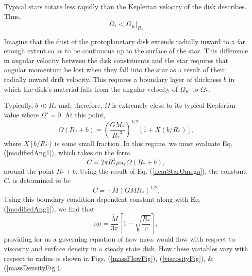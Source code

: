 \documentclass[aps,pra,twocolumn]{revtex4-1}
\begin{document}
Typical stars rotate less rapidly than the Keplerian velocity of the disk describes.  Thus,
\begin{equation}
\Omega_* < \Omega_K\bigg|_{R_*}
\end{equation}

Imagine that the dust of the protoplanetary disk extends radially inward to a far enough extent so as to be continuous up to the surface of the star.  This difference in angular velocity between the disk constituents and the star requires that angular momentum be lost when they fall into the star as a result of their radially inward drift velocity.  This requires a boundary layer of thickness $b$ in which the disk's material falls from the angular velocity of $\Omega_K$ to $\Omega_*$.  

Typically, $b \ll R_*$ and, therefore, $\Omega$ is extremely close to its typical Keplerian value where $\Omega' = 0$.  At this point,
\begin{equation}
\Omega(R_* + b) = \left(\frac{GM_*}{{R_*}^3} \right)^{1/2} \left[1 + X(b/R_*) \right], \label{nearStarOmega}
\end{equation}
where $X[b/R_*]$ is some small fraction.  In this regime, we must evaluate Eq. (\ref{modifiedAng1}), which takes on the form
\begin{equation}
C = 2\pi R_*^3 \mu u_r \Omega(R_* + b) , \nonumber
\end{equation}
around the point $R_* + b$.  Using the result of Eq. (\ref{nearStarOmega}), the constant, $C$,  is determined to be
\begin{equation}
C = - \dot{M}(G M R_*)^{1/2}. \nonumber
\end{equation}
Using this boundary condition-dependent constant along with Eq. (\ref{modifiedAng1}), we find that
\begin{equation}
\nu \mu = \frac{\dot{M}}{3\pi}\left[ 1 - \sqrt{\frac{R_*}{r}} \right], \label{massFlow}
\end{equation}
providing for us a governing equation of how mass would flow with respect to viscosity and surface density in a steady state disk.  How these variables vary with respect to radius is shown in Figs. (\ref{massFlowFig}), (\ref{viscosityFig}), \& (\ref{massDensityFig}).
\end{document}
